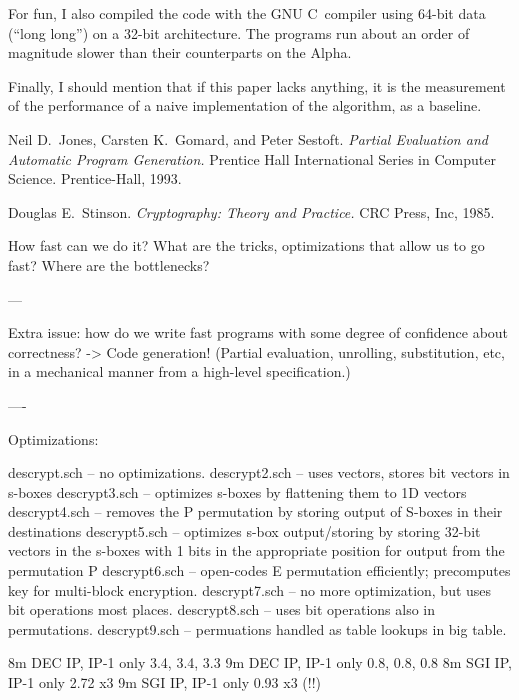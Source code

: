 For fun, I also compiled the code with the GNU C~compiler using 64-bit
data (``long long'') on a 32-bit architecture.  The programs run about an
order of magnitude slower than their counterparts on the Alpha.

Finally, I should mention that if this paper lacks anything, it is the
measurement of the performance of a naive implementation of the
algorithm, as a baseline.


\begin{thebibliography}{9}

Neil D.~Jones, Carsten K.~Gomard, and Peter Sestoft.  {\em Partial Evaluation
and Automatic Program Generation.}  Prentice Hall International Series in
Computer Science.  Prentice-Hall, 1993.

Douglas E.~Stinson. {\em Cryptography: Theory and Practice.}  
CRC Press, Inc, 1985.

\end{thebibliography}




How fast can we do it?
What are the tricks, optimizations that allow us to go fast?
Where are the bottlenecks?

---

Extra issue: how do we write fast programs with some degree of confidence
about correctness?  -> Code generation! (Partial evaluation, unrolling,
substitution, etc, in a mechanical manner from a high-level specification.)

----

Optimizations:

descrypt.sch -- no optimizations.
descrypt2.sch -- uses vectors, stores bit vectors in s-boxes
descrypt3.sch -- optimizes s-boxes by flattening them to 1D vectors
descrypt4.sch -- removes the P permutation by storing output of S-boxes
 in their destinations
descrypt5.sch -- optimizes s-box output/storing by storing 32-bit vectors
 in the s-boxes with 1 bits in the appropriate position for output from
 the permutation P
descrypt6.sch -- open-codes E permutation efficiently; precomputes key
 for multi-block encryption.
descrypt7.sch -- no more optimization, but uses bit operations most places.
descrypt8.sch -- uses bit operations also in permutations.
descrypt9.sch -- permuations handled as table lookups in big table.


8m DEC IP, IP-1 only  3.4, 3.4, 3.3
9m DEC IP, IP-1 only  0.8, 0.8, 0.8
8m SGI IP, IP-1 only  2.72 x3
9m SGI IP, IP-1 only  0.93 x3 (!!)
